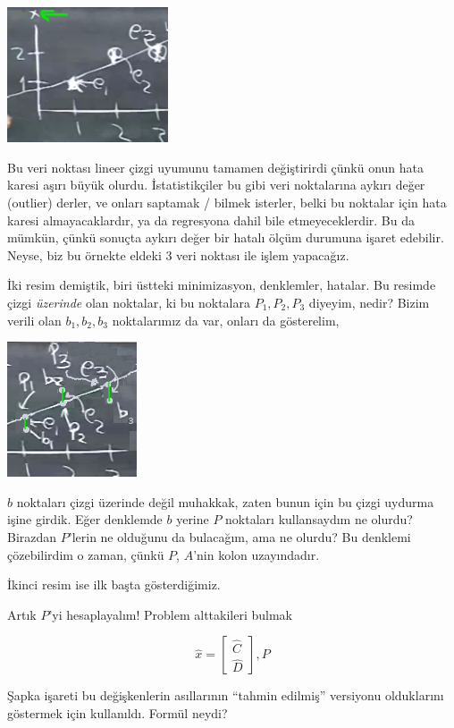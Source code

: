 \documentclass[12pt,fleqn]{article}\usepackage{../../common}
\begin{document}
\includegraphics[height=4cm]{16_4.png}

Bu veri noktası lineer çizgi uyumunu tamamen değiştirirdi çünkü onun hata
karesi aşırı büyük olurdu. İstatistikçiler bu gibi veri noktalarına aykırı
değer (outlier) derler, ve onları saptamak / bilmek isterler, belki bu
noktalar için hata karesi almayacaklardır, ya da regresyona dahil bile
etmeyeceklerdir. Bu da mümkün, çünkü sonuçta aykırı değer bir hatalı ölçüm
durumuna işaret edebilir. Neyse, biz bu örnekte eldeki 3 veri noktası ile
işlem yapacağız.

İki resim demiştik, biri üstteki minimizasyon, denklemler, hatalar. Bu
resimde çizgi {\em üzerinde} olan noktalar, ki bu noktalara $P_1,P_2,P_3$
diyeyim, nedir? Bizim verili olan $b_1,b_2,b_3$ noktalarımız da var, onları
da gösterelim,

\includegraphics[height=4cm]{16_5.png}

$b$ noktaları çizgi üzerinde değil muhakkak, zaten bunun için bu çizgi
uydurma işine girdik. Eğer denklemde $b$ yerine $P$ noktaları kullansaydım
ne olurdu? Birazdan $P$'lerin ne olduğunu da bulacağım, ama ne olurdu? Bu
denklemi çözebilirdim o zaman, çünkü $P$, $A$'nin kolon uzayındadır.

İkinci resim ise ilk başta gösterdiğimiz. 

Artık $P$'yi hesaplayalım! Problem alttakileri bulmak

$$\hat{x} = \left[\begin{array}{r}
\hat{C} \\ \hat{D}
\end{array}\right]
, 
P
$$

Şapka işareti bu değişkenlerin asıllarının ``tahmin edilmiş'' versiyonu
olduklarını göstermek için kullanıldı. Formül neydi? 
\end{document}
